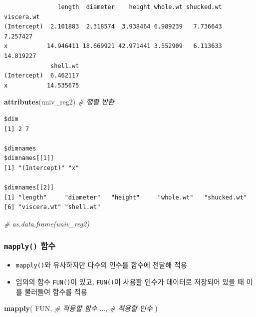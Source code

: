 \documentclass[
  11pt,
]{krantz}
\newenvironment{Shaded}{\begin{snugshade}}{\end{snugshade}}
\newcommand{\CommentTok}[1]{\textcolor[rgb]{0.37,0.37,0.37}{\textit{#1}}}
\newcommand{\KeywordTok}[1]{\textcolor[rgb]{0.27,0.27,0.27}{\textbf{#1}}}
\newcommand{\NormalTok}[1]{#1}
\providecommand{\tightlist}{%
  \setlength{\itemsep}{0pt}\setlength{\parskip}{0pt}}
\begin{document}
\begin{verbatim}
               length  diameter    height whole.wt shucked.wt viscera.wt
(Intercept)  2.101883  2.318574  3.938464 6.989239   7.736643   7.257427
x           14.946411 18.669921 42.971441 3.552909   6.113633  14.819227
             shell.wt
(Intercept)  6.462117
x           14.535675
\end{verbatim}

\begin{Shaded}
\begin{Highlighting}[]
\KeywordTok{attributes}\NormalTok{(univ_reg2) }\CommentTok{# 행렬 반환}
\end{Highlighting}
\end{Shaded}

\begin{verbatim}
$dim
[1] 2 7

$dimnames
$dimnames[[1]]
[1] "(Intercept)" "x"          

$dimnames[[2]]
[1] "length"     "diameter"   "height"     "whole.wt"   "shucked.wt"
[6] "viscera.wt" "shell.wt"  
\end{verbatim}

\begin{Shaded}
\begin{Highlighting}[]
\CommentTok{# as.data.frame(univ_reg2)}
\end{Highlighting}
\end{Shaded}

\normalsize

\hypertarget{mapply}{%
\subsubsection*{\texorpdfstring{\texttt{mapply()} 함수}{mapply() 함수}}\label{mapply}}


\begin{itemize}
\tightlist
\item
  \texttt{mapply()}와 유사하지만 다수의 인수를 함수에 전달해 적용
\item
  임의의 함수 \texttt{FUN()}이 있고, \texttt{FUN()}이 사용할 인수가 데이터로 저장되어 있을 때 이를 불러들여 함수를 적용
\end{itemize}

\footnotesize

\begin{Shaded}
\begin{Highlighting}[]
\KeywordTok{mapply}\NormalTok{(}
\NormalTok{  FUN, }\CommentTok{# 적용할 함수}
\NormalTok{  ..., }\CommentTok{# 적용할 인수}
\NormalTok{)}
\end{Highlighting}
\end{Shaded}
\end{document}
